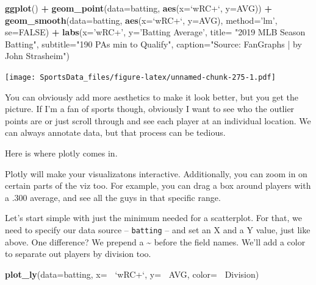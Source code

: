 \documentclass[]{book}
\newenvironment{Shaded}{\begin{snugshade}}{\end{snugshade}}
\newcommand{\DataTypeTok}[1]{\textcolor[rgb]{0.13,0.29,0.53}{#1}}
\newcommand{\KeywordTok}[1]{\textcolor[rgb]{0.13,0.29,0.53}{\textbf{#1}}}
\newcommand{\NormalTok}[1]{#1}
\newcommand{\OperatorTok}[1]{\textcolor[rgb]{0.81,0.36,0.00}{\textbf{#1}}}
\newcommand{\OtherTok}[1]{\textcolor[rgb]{0.56,0.35,0.01}{#1}}
\newcommand{\StringTok}[1]{\textcolor[rgb]{0.31,0.60,0.02}{#1}}
\begin{document}
\begin{Shaded}
\begin{Highlighting}[]
\KeywordTok{ggplot}\NormalTok{() }\OperatorTok{+}
\StringTok{  }\KeywordTok{geom_point}\NormalTok{(}\DataTypeTok{data=}\NormalTok{batting, }\KeywordTok{aes}\NormalTok{(}\DataTypeTok{x=}\StringTok{`}\DataTypeTok{wRC+}\StringTok{`}\NormalTok{, }\DataTypeTok{y=}\NormalTok{AVG)) }\OperatorTok{+}
\StringTok{  }\KeywordTok{geom_smooth}\NormalTok{(}\DataTypeTok{data=}\NormalTok{batting, }\KeywordTok{aes}\NormalTok{(}\DataTypeTok{x=}\StringTok{`}\DataTypeTok{wRC+}\StringTok{`}\NormalTok{, }\DataTypeTok{y=}\NormalTok{AVG), }\DataTypeTok{method=}\StringTok{'lm'}\NormalTok{, }\DataTypeTok{se=}\OtherTok{FALSE}\NormalTok{) }\OperatorTok{+}
\StringTok{  }\KeywordTok{labs}\NormalTok{(}\DataTypeTok{x=}\StringTok{'wRC+'}\NormalTok{, }\DataTypeTok{y=}\StringTok{'Batting Average'}\NormalTok{, }\DataTypeTok{title=} \StringTok{"2019 MLB Season Batting"}\NormalTok{, }\DataTypeTok{subtitle=}\StringTok{"190 PAs min to Qualify"}\NormalTok{, }\DataTypeTok{caption=}\StringTok{"Source:  FanGraphs | by John Strasheim"}\NormalTok{)}
\end{Highlighting}
\end{Shaded}

\texttt{[image: SportsData\_files/figure-latex/unnamed-chunk-275-1.pdf]}

You can obviously add more aesthetics to make it look better, but you get the picture. If I'm a fan of sports though, obviously I want to see who the outlier points are or just scroll through and see each player at an individual location. We can always annotate data, but that process can be tedious.

Here is where plotly comes in.

Plotly will make your visualizatons interactive. Additionally, you can zoom in on certain parts of the viz too. For example, you can drag a box around players with a .300 average, and see all the guys in that specific range.

Let's start simple with just the minimum needed for a scatterplot. For that, we need to specify our data source -- \texttt{batting} -- and set an X and a Y value, just like above. One difference? We prepend a \textasciitilde{} before the field names. We'll add a color to separate out players by division too.

\begin{Shaded}
\begin{Highlighting}[]
\KeywordTok{plot_ly}\NormalTok{(}\DataTypeTok{data=}\NormalTok{batting, }\DataTypeTok{x=} \OperatorTok{~}\StringTok{`}\DataTypeTok{wRC+}\StringTok{`}\NormalTok{, }\DataTypeTok{y=} \OperatorTok{~}\NormalTok{AVG, }\DataTypeTok{color=} \OperatorTok{~}\NormalTok{Division)}
\end{Highlighting}
\end{Shaded}
\end{document}
